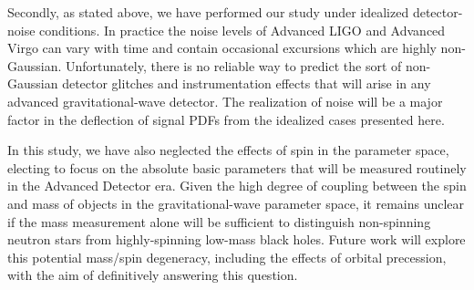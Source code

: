 \documentclass[11pt,a4paper]{emulateapj} 
\begin{document}
Secondly, as stated above, we have performed our study under idealized
detector-noise conditions.  In practice the noise levels of Advanced
LIGO and Advanced Virgo can vary with time and contain occasional
excursions which are highly non-Gaussian.  Unfortunately, there is no
reliable way to predict the sort of non-Gaussian detector glitches and
instrumentation effects that will arise in any advanced
gravitational-wave detector.  The realization of noise will be a
major factor in the deflection of signal PDFs from the idealized cases
presented here.

In this study, we have also neglected the effects of spin in the
parameter space, electing to focus on the absolute basic parameters
that will be measured routinely in the Advanced Detector era.  Given
the high degree of coupling between the spin and mass of objects
in the gravitational-wave parameter space, it remains unclear if the
mass measurement alone will be sufficient to distinguish non-spinning
neutron stars from highly-spinning low-mass black holes.  Future work
will explore this potential mass/spin degeneracy, including the
effects of orbital precession, with the aim of definitively answering
this question.

 {}
\end{document}
